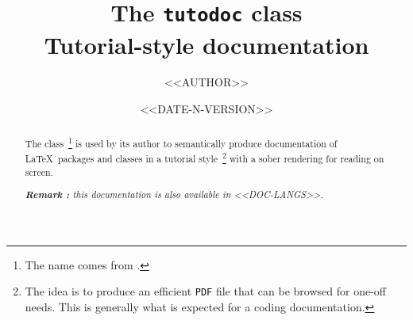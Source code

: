 \documentclass{tutodoc}
\begin{document}
\title{The \texttt{tutodoc} class \\ Tutorial-style documentation}
\author{<<AUTHOR>>}
\date{<<DATE-N-VERSION>>}

\maketitle

\begin{abstract}
    The \thisproj{} class\,%
    \footnote{
        The name comes from .
    }
    is used by its author to semantically produce documentation of \LaTeX\ packages and classes in a tutorial style\,%
    \footnote{
        The idea is to produce an efficient \texttt{PDF} file that can be browsed for one-off needs. This is generally what is expected for a coding documentation.
    }
    with a sober rendering for reading on screen.

    \smallskip

    \noindent
    \emph{\textbf{Remark :} this documentation is also available in <<DOC-LANGS>>.}
\end{abstract}
\end{document}
